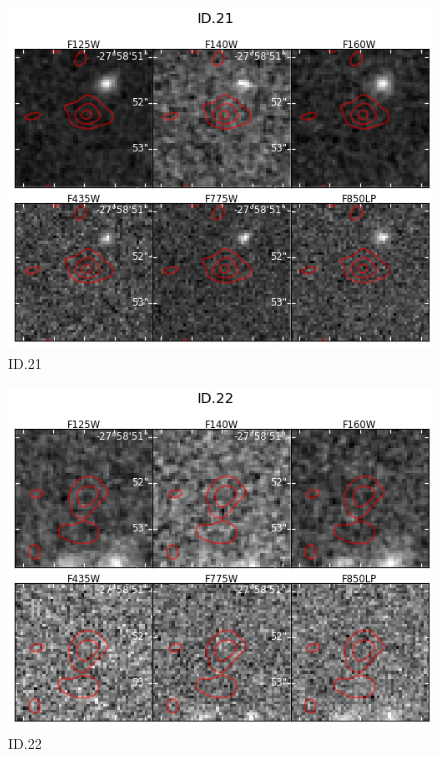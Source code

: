 \begin{figure}[tbp]
\centering \includegraphics[width=160mm]{Matched/ASPECS_Cutout_20.jpg}
\caption{ID.21}
\label{fig:Match_Three}
\end{figure}

\begin{figure}[tbp]
\centering \includegraphics[width=160mm]{Matched/ASPECS_Cutout_21.jpg}
\caption{ID.22}
\label{fig:Match_Three}
\end{figure}

